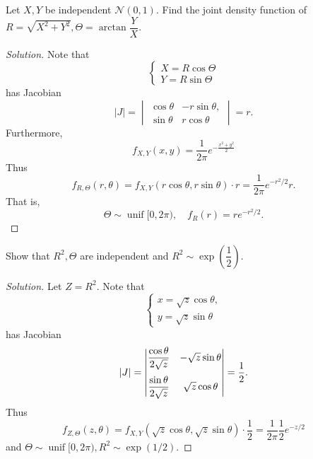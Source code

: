 \documentclass[11pt,singlecolumn, openany, citestyle=authoryear]{elegantbook}
\begin{document}
\begin{CJK}{UTF8}{gbsn}
\begin{example}
    Let $X,Y$ be independent $\mathcal{N}(0,1)$. Find the joint density function of 
    $R=\sqrt{X^2+Y^2}, \Theta = \arctan \dfrac{Y}{X}$.
\end{example}
\begin{proof}[Solution]
    Note that 
    $$
    \begin{cases}
        X=R\cos \Theta\\
        Y=R \sin \Theta
    \end{cases}
    $$
    has Jacobian
    $$
    |J|=\begin{vmatrix}
        \cos \theta & -r\sin \theta,\\
        \sin \theta & r \cos \theta
    \end{vmatrix}
    =r.
    $$
    Furthermore, 
    $$
    f_{X,Y}(x,y)=\frac{1}{2\pi}e^{-\frac{x^2+y^2}{2}}
    $$
    Thus 
    $$
    f_{R,\Theta}(r,\theta)= f_{X,Y}(r\cos \theta, r \sin \theta) \cdot r
    =\frac{1}{2\pi}e^{-r^2/2}r.
    $$
    That is,
    $$
    \Theta \sim \operatorname*{unif}[0,2\pi),\quad
    f_R(r)=re^{-r^2/2}.
    $$
\end{proof}
\begin{exercise}
    Show that $R^2,\Theta$ are independent and $R^2 \sim \operatorname*{exp}
    \left(\dfrac{1}{2}\right)$.
\end{exercise}
\begin{proof}[Solution]
    Let $Z=R^2$.
    Note that 
    $$
    \begin{cases}
        x=\sqrt{z}\cos \theta,\\
        y=\sqrt{z} \sin \theta
    \end{cases}
    $$
    has Jacobian
    $$
    |J|=\begin{vmatrix}
        \vspace{1.5ex}
        \dfrac{\cos \theta}{2\sqrt{z}} & -\sqrt{z}\sin \theta\\
        \dfrac{\sin \theta}{2\sqrt{z}} & \sqrt{z} \cos \theta
    \end{vmatrix}
    =\frac{1}{2}.
    $$
    Thus 
    $$
    f_{Z,\Theta}(z,\theta)= f_{X,Y}(\sqrt{z}\cos \theta, \sqrt{z} \sin \theta) \cdot \frac{1}{2}
    =\frac{1}{2\pi}\frac{1}{2}e^{-z/2}
    $$
    and $\Theta \sim \operatorname*{unif}[0,2\pi), R^2 \sim \operatorname{exp}(1/2)$.
\end{proof}


\end{CJK}
\end{document}
